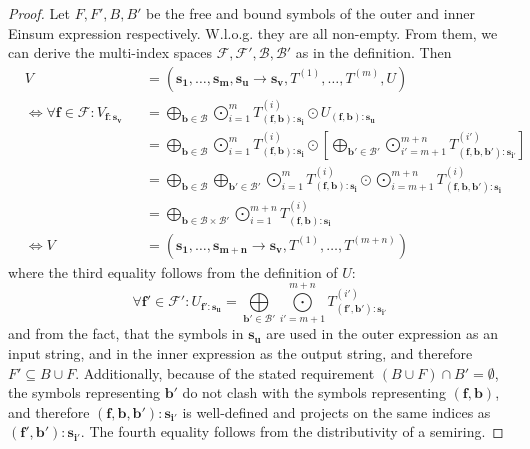 \bigskip
\begin{proof}
    \small
    Let $F, F', B, B'$ be the free and bound symbols of the outer and inner Einsum expression respectively.
    W.l.o.g. they are all non-empty.
    From them, we can derive the multi-index spaces $\mathcal{F}, \mathcal{F}', \mathcal{B}, \mathcal{B}'$ as in the definition.
    Then
    \begin{align*}
         & V                                                         &  & = (\bm{s_1},\dots,\bm{s_m}, \bm{s_u} \rightarrow \bm{s_v}, T^{(1)},\dots,T^{(m)}, U)                                                                                                                                                                             \\
         & \iff \forall \bm{f} \in \mathcal{F}: V_{\bm{f}: \bm{s_v}} &  & = \bigoplus\limits_{\bm{b} \in \mathcal{B}} \bigodot\limits_{i = 1}^{m} T^{(i)}_{(\bm{f}, \bm{b}):\bm{s_i}} \odot U_{(\bm{f}, \bm{b}):\bm{s_u}}                                                                                                                  \\
         &                                                           &  & = \bigoplus\limits_{\bm{b} \in \mathcal{B}} \bigodot\limits_{i = 1}^{m} T^{(i)}_{(\bm{f}, \bm{b}):\bm{s_i}} \odot \left[\bigoplus\limits_{\bm{b'} \in \mathcal{B}'} \bigodot\limits_{i' = m + 1}^{m + n} T^{(i')}_{(\bm{f}, \bm{b}, \bm{b'}):\bm{s_{i'}}}\right] \\
         &                                                           &  & = \bigoplus\limits_{\bm{b} \in \mathcal{B}} \bigoplus\limits_{\bm{b'} \in \mathcal{B}'} \bigodot\limits_{i = 1}^{m} T^{(i)}_{(\bm{f}, \bm{b}):\bm{s_i}} \odot \bigodot\limits_{i = m + 1}^{m + n} T^{(i)}_{(\bm{f}, \bm{b}, \bm{b'}):\bm{s_{i}}}                 \\
         &                                                           &  & = \bigoplus\limits_{\bm{b} \in \mathcal{B} \times \mathcal{B}'} \bigodot\limits_{i = 1}^{m + n} T^{(i)}_{(\bm{f}, \bm{b}):\bm{s_i}}                                                                                                                              \\
         & \iff V                                                    &  & = (\bm{s_1}, \dots, \bm{s_{m + n}} \rightarrow \bm{s_v}, T^{(1)}, \dots, T^{(m + n)})
    \end{align*}
    where the third equality follows from the definition of $U$:
    $$\forall \bm{f'} \in \mathcal{F}': U_{\bm{f'}: \bm{s_u}} = \bigoplus\limits_{\bm{b'} \in \mathcal{B}'} \bigodot\limits_{i' = m + 1}^{m + n} T^{(i')}_{(\bm{f'}, \bm{b'}):\bm{s_{i'}}}$$
    and from the fact, that the symbols in $\bm{s_u}$ are used in the outer expression as an input string, and in the inner expression as the output string, and therefore $F' \subseteq B \cup F$.
    Additionally, because of the stated requirement $(B \cup F) \cap B' = \emptyset$, the symbols representing $\bm{b'}$ do not clash with the symbols representing $(\bm{f}, \bm{b})$, and therefore $(\bm{f}, \bm{b}, \bm{b'}):\bm{s_{i'}}$ is well-defined and projects on the same indices as $(\bm{f'}, \bm{b'}):\bm{s_{i'}}$.
    The fourth equality follows from the distributivity of a semiring.
\end{proof}
\bigskip
